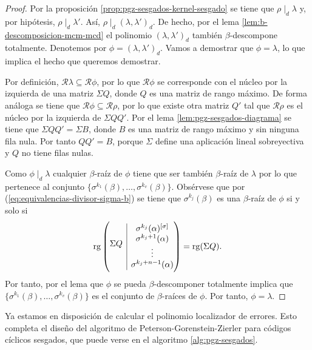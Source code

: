 \begin{proof}
  Por la proposición \ref{prop:pgz-sesgados-kernel-sesgado} se tiene que \(\rho \mid_d \lambda\) y, por hipótesis, \(\rho \mid_d \lambda'\).
  Así, \(\rho \mid_d (\lambda, \lambda')_{d}\).
  De hecho, por el lema \ref{lem:b-descomposicion-mcm-mcd} el polinomio \((\lambda, \lambda')_{d}\) también \(\beta\)-descompone totalmente.
  Denotemos por \(\phi = (\lambda, \lambda')_{d}\).
  Vamos a demostrar que \(\phi = \lambda\), lo que implica el hecho que queremos demostrar.

  Por definición, \(\mathcal R \lambda \subseteq \mathcal R\phi\), por lo que \(\mathcal R\phi\) se corresponde con el núcleo por la izquierda de una matriz \(\Sigma Q\), donde \(Q\) es una matriz de rango máximo.
  De forma análoga se tiene que \(\mathcal R\phi \subseteq \mathcal R\rho\), por lo que existe otra matriz \(Q'\) tal que \(\mathcal R\rho\) es el núcleo por la izquierda de \(\Sigma QQ'\).
  Por el lema \ref{lem:pgz-sesgados-diagrama} se tiene que \(\Sigma QQ' = \Sigma B\), donde \(B\) es una matriz de rango máximo y sin ninguna fila nula.
  Por tanto \(QQ' = B\), porque \(\Sigma\) define una aplicación lineal sobreyectiva y \(Q\) no tiene filas nulas.

  Como \(\phi \mid_d \lambda\) cualquier \(\beta\)-raíz de \(\phi\) tiene que ser también \(\beta\)-raíz de \(\lambda\) por lo que pertenece al conjunto \(\{\sigma^{k_1}(\beta), \dots, \sigma^{k_v}(\beta)\}\).
  Obsérvese que por (\ref{eq:equivalencias-divisor-sigma-b}) se tiene que \(\sigma^{k_j}(\beta)\) es una \(\beta\)-raíz de \(\phi\) si y solo si
  \[
    \rank\left( \begin{array}{@{}c|c@{}}
      \multirow{4}{*}{\(\Sigma Q\)} & \sigma^{k_j}(\alpha)^{[\sigma]}\\
       & \sigma^{k_j + 1}(\alpha)\\
       & \vdots \\
       & \sigma^{k_j + n - 1}(\alpha)
    \end{array}\right) = \rank(\Sigma Q).
  \]
  Por tanto, por el lema \parencite[Lema 2.3]{gomez-torrecillas_petersongorensteinzierler_2018} que \(\phi\) se pueda \(\beta\)-descomponer totalmente implica que \(\{\sigma^{k_1}(\beta), \dots, \sigma^{k_v}(\beta)\}\) es el conjunto de \(\beta\)-raíces de \(\phi\).
  Por tanto, \(\phi = \lambda\).
\end{proof}

Ya estamos en disposición de calcular el polinomio localizador de errores.
Esto completa el diseño del algoritmo de Peterson-Gorenstein-Zierler para códigos cíclicos sesgados, que puede verse en el algoritmo \ref{alg:pgz-sesgados}.

